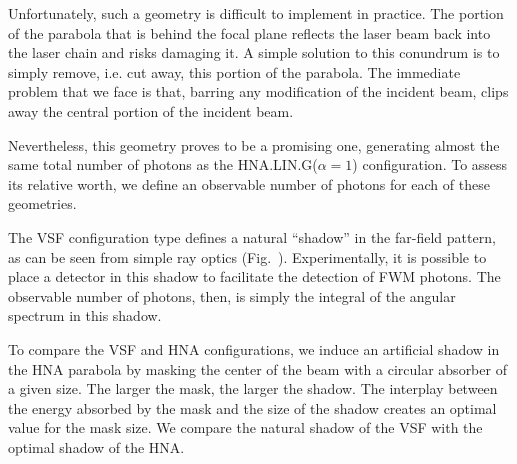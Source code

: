 \documentclass[11pt,SymmetricalJury]{inrsthesis/inrsthesis}
\begin{document}
Unfortunately, such a geometry is difficult to implement in practice. The portion
of the parabola that is behind the focal plane reflects the laser beam back
into the laser chain and risks damaging it. A simple solution to this conundrum
is to simply remove, i.e. cut away, this portion of the parabola. The immediate
problem that we face is that, barring any modification of the incident beam,
clips away the central portion of the incident beam.

Nevertheless, this geometry proves to be a promising one, generating almost
the same total number of photons as the HNA.LIN.G($\alpha=1$) configuration.
To assess its relative worth, we define an observable number of photons
for each of these geometries.

The VSF configuration type defines a natural ``shadow'' in the far-field
pattern, as can be seen from simple ray optics (Fig.~{}). Experimentally, it is
possible to place a detector in this shadow to facilitate the detection of FWM
photons. The observable number of photons, then, is simply the integral of the
angular spectrum in this shadow.

To compare the VSF and HNA configurations, we induce an artificial shadow in
the HNA parabola by masking the center of the beam with a circular absorber
of a given size. The larger the mask, the larger the shadow. The interplay
between the energy absorbed by the mask and the size of the shadow creates
an optimal value for the mask size. We compare the natural shadow of the VSF
with the optimal shadow of the HNA.


\renewcommand{\chart}[1]{
  \ChartBox{#1}{0.22\textwidth/6.09*#1}{phd_orange}}

\end{document}
